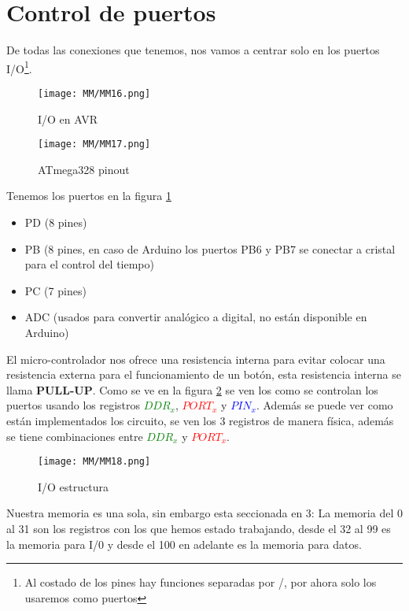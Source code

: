 \documentclass[
	12pt, %
	fleqn, %
	a4paper, %
]{LegrandOrangeBook}
\begin{document}
\section{Control de puertos}\label{Control de puertos}
De todas las conexiones que tenemos, nos vamos a centrar solo en los puertos I/O\footnote{Al costado de los pines hay funciones separadas por /, por ahora solo los usaremos como puertos}.
\begin{figure}[H]
\centering
\texttt{[image: MM/MM16.png]}
\caption{I/O en AVR}
\end{figure}
\begin{figure}[]
\centering
\texttt{[image: MM/MM17.png]}
\label{fig:ATmega328 pinout}
\caption{ATmega328 pinout}
\end{figure}
Tenemos los puertos en la figura \ref{fig:ATmega328 pinout}
\begin{itemize}
\item PD (8 pines)
\item PB (8 pines, en caso de Arduino los puertos PB6 y PB7 se conectar a cristal para el control del tiempo)
\item PC (7 pines)
\item ADC (usados para convertir analógico a digital, no están disponible en Arduino)
\end{itemize}
El micro-controlador nos ofrece una resistencia interna para evitar colocar una resistencia externa para el funcionamiento de un botón, esta resistencia interna se llama \textbf{PULL-UP}. Como se ve en la figura \ref{fig:I/O estructura} se ven los como se controlan los puertos usando los registros \textcolor{green}{$DDR_x$}, \textcolor{red}{$PORT_x$} y \textcolor{blue}{$PIN_x$}. Además se puede ver como están implementados los circuito, se ven los 3 registros de manera física, además se tiene combinaciones entre \textcolor{green}{$DDR_x$} y \textcolor{red}{$PORT_x$}.
\begin{figure}[H]
\centering
\texttt{[image: MM/MM18.png]}
\label{fig:I/O estructura}
\caption{I/O estructura}
\end{figure}
\begin{remark}
Nuestra memoria es una sola, sin embargo esta seccionada en 3: La memoria del 0 al 31 son los registros con los que hemos estado trabajando, desde el 32 al 99 es la memoria para I/0 y desde el 100 en adelante es la memoria para datos.
\end{remark}
\end{document}
